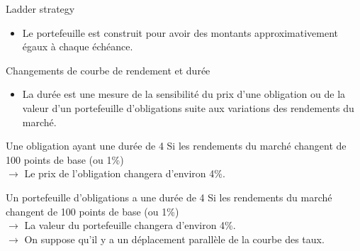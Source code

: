 \documentclass{beamer}
\begin{document}
\begin{frame}{Ladder strategy}
\begin{itemize}[label=\bullet]
\item Le portefeuille est construit pour avoir des montants approximativement égaux à chaque échéance.
\end{itemize}

\vspace{1cm}

\begin{center}

   \end{center}
\end{frame}

\begin{frame}{Changements de courbe de rendement et durée}
\begin{itemize}[label=\bullet]
\item La durée est une mesure de la sensibilité du prix d'une obligation ou de la valeur d'un portefeuille d'obligations suite aux variations des rendements du marché.
\end{itemize}
\begin{block}{Une obligation ayant une durée de 4}
Si les rendements du marché changent de 100 points de base (ou 1\%)\\
$\rightarrow$ Le prix de l'obligation changera d'environ 4\%.
\end{block}
\begin{block}{Un portefeuille d'obligations a une durée de 4}
Si les rendements du marché changent de 100 points de base (ou 1\%)\\
$\rightarrow$ La valeur du portefeuille changera d'environ 4\%.\\
$\rightarrow$ On suppose qu'il y a un déplacement parallèle de la courbe des taux.
\end{block}
\end{frame}
\end{document}
